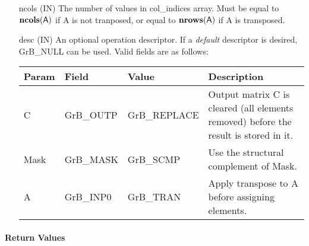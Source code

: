 \begin{itemize}[leftmargin=1in]
    \item[{\sf ncols}] ({\sf IN}) The number of values in {\sf col\_indices} 
	array. Must be equal to $\bold{ncols}({\sf A})$ if {\sf A} is not tranposed,
	or equal to $\bold{nrows}({\sf A})$ if {\sf A} is transposed.

    \item[{\sf desc}]     ({\sf IN}) An optional operation descriptor.  If a 
    \emph{default} descriptor is desired, {\sf GrB\_NULL} can be used.  Valid 
    fields are as follows: \\
    
    \begin{tabular}{lllp{2.5in}}
        Param & Field  & Value & Description \\
        \hline
        {\sf C}    & {\sf GrB\_OUTP} & {\sf GrB\_REPLACE} & Output matrix {\sf C}
        is cleared (all elements removed) before the result is stored in it. \\
        
        {\sf Mask} & {\sf GrB\_MASK} & {\sf GrB\_SCMP}   & Use the structural 
        complement of {\sf Mask}. \\

        {\sf A}    & {\sf GrB\_INP0} & {\sf GrB\_TRAN}   & Apply transpose to 
        {\sf A} before assigning elements.
    \end{tabular}
\end{itemize}

\paragraph{Return Values}


